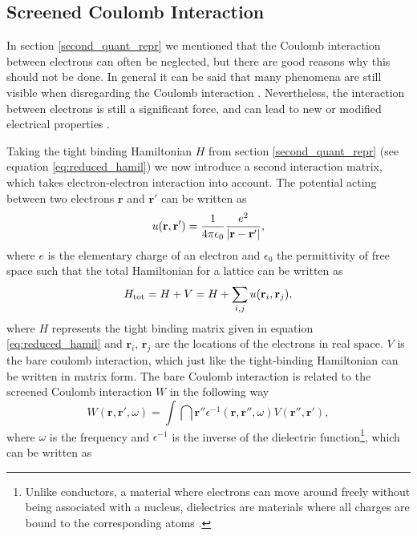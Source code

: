 \subsection{Screened Coulomb Interaction}\label{screened_coul_inter}

In section \ref{second_quant_repr} we mentioned that the Coulomb interaction between electrons can often be neglected, but there are good reasons why this should not be done. In general it can be said that many phenomena are still visible when disregarding the Coulomb interaction \cite{Patterson2007}. Nevertheless, the interaction between electrons is still a significant force, and can lead to new or modified electrical properties \cite{Patterson2007}.

Taking the tight binding Hamiltonian $H$ from section \ref{second_quant_repr} (see equation \ref{eq:reduced_hamil}) we now introduce a second interaction matrix, which takes electron-electron interaction into account. The potential acting between two electrons $\mathbf{r}$ and $\mathbf{r}'$ can be written as \cite{Czycholl2016}
\begin{equation}\label{eq:classical_coul}
    u(\mathbf{r},\mathbf{r}')=\frac{1}{4\pi\epsilon_0}\frac{e^2}{\left|\mathbf{r}-\mathbf{r}'\right|},
\end{equation}
where $e$ is the elementary charge of an electron and $\epsilon_0$ the permittivity of free space such that the total Hamiltonian for a lattice can be written as
\begin{equation}
    H_{\text{tot}} = H + V = H + \sum_{i,j} u(\mathbf{r}_i,\mathbf{r}_j),
\end{equation}
where $H$ represents the tight binding matrix given in equation \ref{eq:reduced_hamil} \cite{Czycholl2016} and $\mathbf{r}_i$, $\mathbf{r}_j$ are the locations of the electrons in real space. $V$ is the bare coulomb interaction, which just like the tight-binding Hamiltonian can be written in matrix form. The bare Coulomb interaction is related to the screened Coulomb interaction $W$ in the following way \cite{katsnelson2012,Montaghemi2020}
\begin{equation}\label{eq:W_r_r_omega}
    W(\mathbf{r},\mathbf{r}',\omega)=\int\dint\mathbf{r}''\epsilon^{-1}(\mathbf{r},\mathbf{r}'',\omega)V(\mathbf{r}'',\mathbf{r}'),
\end{equation}
where $\omega$ is the frequency and $\epsilon^{-1}$ is the inverse of the dielectric function\footnote{Unlike conductors, a material where electrons can move around freely without being associated with a nucleus, dielectrics are materials where all charges are bound to the corresponding atoms \cite{Griffiths_electro}.}, which can be written as
